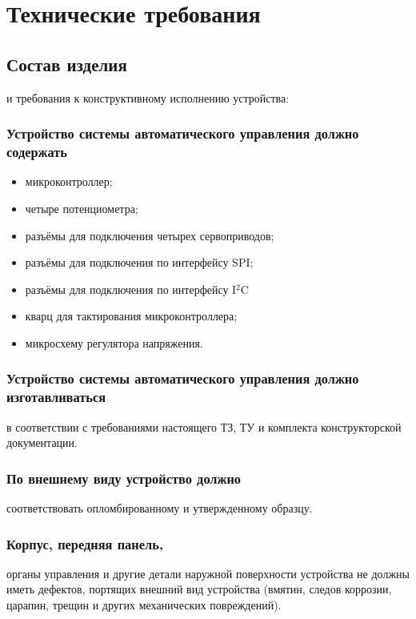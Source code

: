 \documentclass[a4paper]{bsuir-tor}
\begin{document}
\section{Технические требования}

\subsection{Состав изделия} и требования к конструктивному исполнению
устройства:

\subsubsection{Устройство системы автоматического управления должно содержать}

\begin{itemize}
\item микроконтроллер;
\item четыре потенциометра;
\item разъёмы для подключения четырех сервоприводов;
\item разъёмы для подключения по интерфейсу SPI;
\item разъёмы для подключения по интерфейсу I$^2$C
  
\item кварц для тактирования микроконтроллера;  
\item микросхему регулятора напряжения.
\end{itemize}

  \subsubsection{Устройство системы автоматического управления должно
    изготавливаться}
  в соответствии с требованиями настоящего ТЗ, ТУ и комплекта
  конструкторской документации.

  \subsubsection{По внешнему виду устройство должно}
  соответствовать опломбированному и утвержденному образцу.
  
  \subsubsection{Корпус, передняя панель, }
  органы управления и другие детали наружной поверхности устройства не
  должны иметь дефектов, портящих внешний вид устройства (вмятин, следов
  коррозии, царапин, трещин и других механических повреждений).
  
\end{document}
